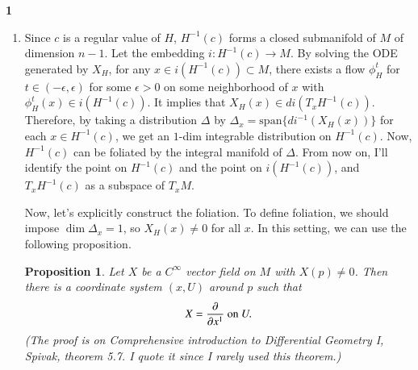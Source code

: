 \documentclass[a4paper, 12pt]{article}
\theoremstyle{Mydefinition}
\theoremstyle{Mytheorem}
\newtheorem{proposition}[statement]{Proposition}
\begin{document}
\noindent \textbf{1}
\begin{enumerate}
    \item Since $c$ is a regular value of $H$, $H^{-1}(c)$ forms a closed submanifold of $M$ of dimension $n-1$. Let the embedding $i:H^{-1}(c)\rightarrow M$. By solving the ODE generated by $X_H$, for any $x\in i(H^{-1}(c))\subset M$, there exists a flow $\phi^t_H$ for $t\in (-\epsilon, \epsilon)$ for some $\epsilon>0$ on some neighborhood of $x$ with $\phi^t_H(x)\in i(H^{-1}(c))$. It implies that $X_H(x)\in di\left(T_xH^{-1}(c)\right)$. Therefore, by taking a distribution $\Delta$ by $\Delta_x = \mathrm{span}\{di^{-1}(X_H(x))\}$ for each $x\in H^{-1}(c)$, we get an $1$-dim integrable distribution on $H^{-1}(c)$. Now, $H^{-1}(c)$ can be foliated by the integral manifold of $\Delta$. From now on, I'll identify the point on $H^{-1}(c)$ and the point on $i(H^{-1}(c))$, and $T_xH^{-1}(c)$ as a subspace of $T_xM$. 
    
    Now, let's explicitly construct the foliation. To define foliation, we should impose $\dim \Delta_x = 1$, so $X_H(x) \neq 0$ for all $x$. In this setting, we can use the following proposition.
    \begin{proposition}
        Let $X$ be a $C^\infty$ vector field on $M$ with $X(p)\neq 0$. Then there is a coordinate system $(x,U)$ around $p$ such that
        \begin{equation*}
            X = \pdv{x^1}\textrm{ on }U.
        \end{equation*}
        (The proof is on \textit{Comprehensive introduction to Differential Geometry I}, Spivak, theorem 5.7. I quote it since I rarely used this theorem.)
    \end{proposition}
    

\end{enumerate}
\end{document}
